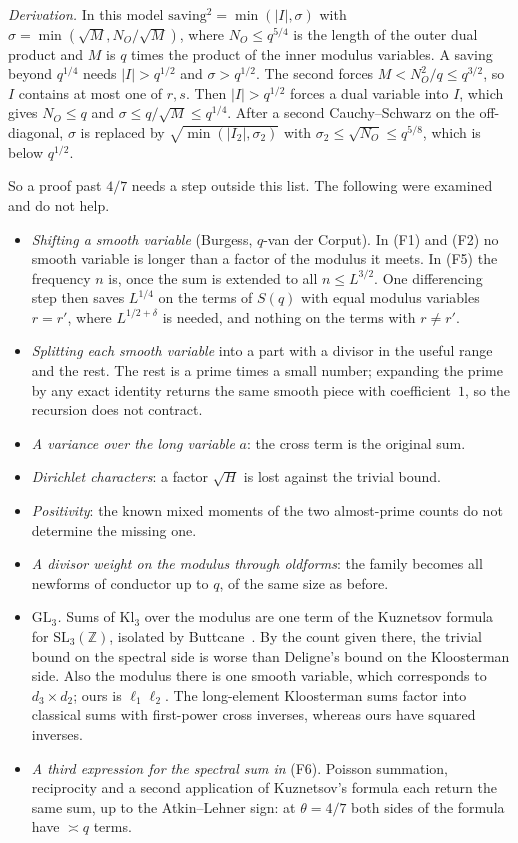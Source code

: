 \documentclass[11pt]{amsart}
\theoremstyle{definition}
\theoremstyle{remark}
\numberwithin{equation}{section}
\newcommand{\Z}{\mathbb Z}
\begin{document}
\emph{Derivation.}  In this model
$\text{saving}^2=\min(|I|,\sigma)$ with
$\sigma=\min(\sqrt M,N_O/\sqrt M)$, where $N_O\le q^{5/4}$ is the length of
the outer dual product and $M$ is $q$ times the product of the inner
modulus variables.  A saving beyond $q^{1/4}$ needs $|I|>q^{1/2}$ and
$\sigma>q^{1/2}$.  The second forces $M<N_O^2/q\le q^{3/2}$, so $I$ contains
at most one of $r,s$.  Then $|I|>q^{1/2}$ forces a dual variable into $I$,
which gives $N_O\le q$ and $\sigma\le q/\sqrt M\le q^{1/4}$.  After a
second Cauchy--Schwarz on the off-diagonal, $\sigma$ is replaced by
$\sqrt{\min(|I_2|,\sigma_2)}$ with $\sigma_2\le\sqrt{N_O}\le q^{5/8}$, which
is below $q^{1/2}$.

\medskip
So a proof past $4/7$ needs a step outside this list.  The following were
examined and do not help.
\begin{itemize}
\item \emph{Shifting a smooth variable} (Burgess, $q$-van der Corput).  In
(F1) and (F2) no smooth variable is longer than a factor of the modulus it
meets.  In (F5) the frequency $n$ is, once the sum is extended to all
$n\le L^{3/2}$.  One differencing step then saves $L^{1/4}$ on the terms
of $S(q)$ with equal modulus variables $r=r'$, where $L^{1/2+\delta}$ is
needed, and nothing on the terms with $r\ne r'$.
\item \emph{Splitting each smooth variable} into a part with a divisor in
the useful range and the rest.  The rest is a prime times a small number;
expanding the prime by any exact identity returns the same smooth piece
with coefficient~$1$, so the recursion does not contract.
\item \emph{A variance over the long variable} $a$: the cross term is the
original sum.
\item \emph{Dirichlet characters}: a factor $\sqrt H$ is lost against the
trivial bound.
\item \emph{Positivity}: the known mixed moments of the two almost-prime
counts do not determine the missing one.
\item \emph{A divisor weight on the modulus through oldforms}: the family
becomes all newforms of conductor up to $q$, of the same size as before.
\item \emph{$\mathrm{GL}_3$.}  Sums of $\mathrm{Kl}_3$ over the modulus are
one term of the Kuznetsov formula for $\mathrm{SL}_3(\Z)$, isolated by
Buttcane~\cite{But}.  By the count given there, the trivial bound on the
spectral side is worse than Deligne's bound on the Kloosterman side.  Also
the modulus there is one smooth variable, which corresponds to
$d_3\times d_2$; ours is $\ell_1\ell_2$.  The long-element Kloosterman sums
factor into classical sums with first-power cross inverses, whereas ours
have squared inverses.
\item \emph{A third expression for the spectral sum in} (F6).  Poisson
summation, reciprocity and a second application of Kuznetsov's formula each
return the same sum, up to the Atkin--Lehner sign: at $\theta=4/7$ both
sides of the formula have $\asymp q$ terms.
\end{itemize}
\end{document}

